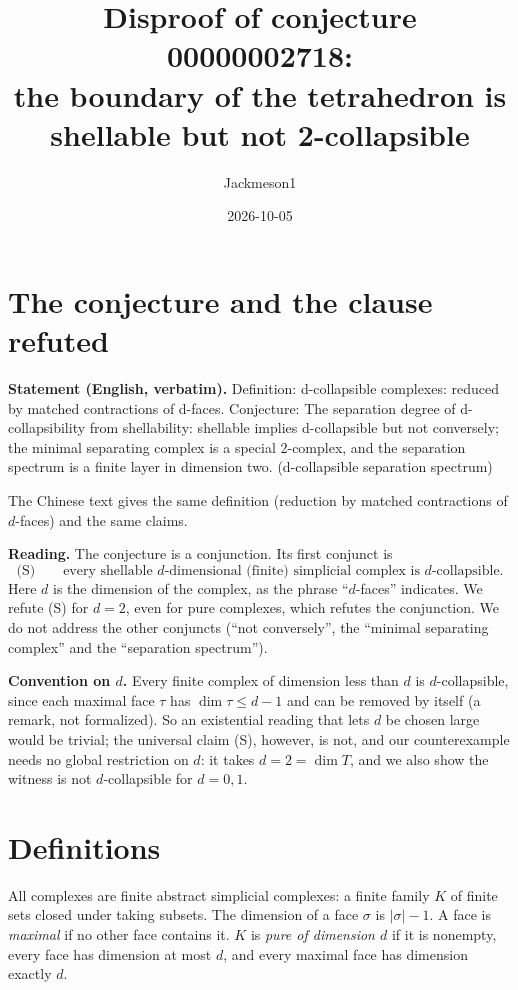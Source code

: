 \documentclass[11pt]{article}
\title{Disproof of conjecture 00000002718:\\ the boundary of the tetrahedron is shellable but not 2-collapsible}
\author{Jackmeson1}
\date{2026-10-05}
\theoremstyle{definition}
\begin{document}
\maketitle

\section{The conjecture and the clause refuted}

\textbf{Statement (English, verbatim).} Definition: d-collapsible complexes: reduced by matched
contractions of d-faces. Conjecture: The separation degree of d-collapsibility from shellability:
shellable implies d-collapsible but not conversely; the minimal separating complex is a special
2-complex, and the separation spectrum is a finite layer in dimension two. (d-collapsible separation
spectrum)

The Chinese text gives the same definition (reduction by matched contractions of $d$-faces) and the
same claims.

\textbf{Reading.} The conjecture is a conjunction. Its first conjunct is
\[
  \text{(S)}\qquad \text{every shellable } d\text{-dimensional (finite) simplicial complex is } d\text{-collapsible.}
\]
Here $d$ is the dimension of the complex, as the phrase ``$d$-faces'' indicates. We refute (S) for
$d=2$, even for pure complexes, which refutes the conjunction. We do not address the other
conjuncts (``not conversely'', the ``minimal separating complex'' and the ``separation spectrum'').

\textbf{Convention on $d$.} Every finite complex of dimension less than $d$ is $d$-collapsible,
since each maximal face $\tau$ has $\dim\tau\le d-1$ and can be removed by itself (a remark, not
formalized). So an existential reading that lets $d$ be chosen large would be trivial; the
universal claim (S), however, is not, and our counterexample needs no global restriction on $d$:
it takes $d=2=\dim T$, and we also show the witness is not $d$-collapsible for $d=0,1$.

\section{Definitions}

All complexes are finite abstract simplicial complexes: a finite family $K$ of finite sets closed
under taking subsets. The dimension of a face $\sigma$ is $|\sigma|-1$. A face is \emph{maximal} if
no other face contains it. $K$ is \emph{pure of dimension $d$} if it is nonempty, every face has
dimension at most $d$, and every maximal face has dimension exactly $d$.
\end{document}
